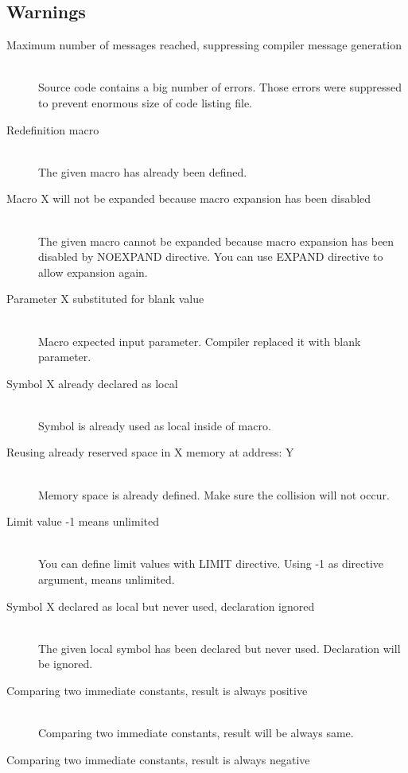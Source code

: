     \subsection{Warnings}
        \begin{description}
            \item[Maximum number of messages reached, suppressing compiler message generation]~\\
                Source code contains a big number of errors. Those errors were suppressed to prevent enormous size of code listing file.
            \item[Redefinition macro]~\\
                The given macro has already been defined.
            \item[Macro X will not be expanded because macro expansion has been disabled]~\\
                The given macro cannot be expanded because macro expansion has been disabled by NOEXPAND directive. You can use EXPAND directive to allow expansion again.
            \item[Parameter X substituted for blank value ]~\\
                Macro expected input parameter. Compiler replaced it with blank parameter.
            \item[Symbol X already declared as local]~\\
                Symbol is already used as local inside of macro.
            \item[Reusing already reserved space in X memory at address: Y]~\\
                Memory space is already defined. Make sure the collision will not occur.
            \item[Limit value -1 means unlimited]~\\
                You can define limit values with LIMIT directive. Using -1 as directive argument, means unlimited.
            \item[Symbol X declared as local but never used, declaration ignored]~\\
                The given local symbol has been declared but never used. Declaration will be ignored.
            \item[Comparing two immediate constants, result is always positive]~\\
                Comparing two immediate constants, result will be always same.
            \item[Comparing two immediate constants, result is always negative]~\\

\end{description}
